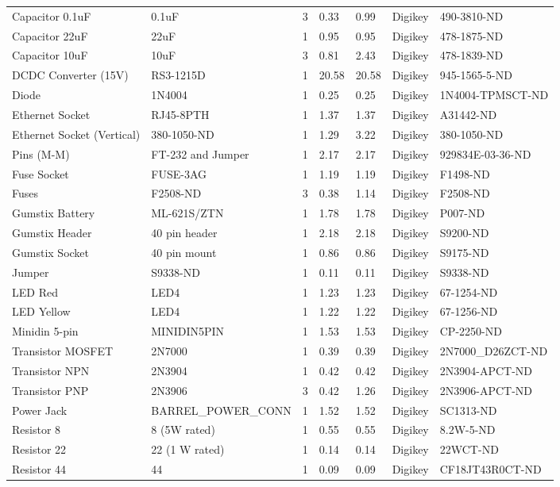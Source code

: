 \begin{landscape}
\begin{center}
\begin{longtable}{|p{2in}|p{1.5in}|p{.75in}|p{.5in}|p{.5in}|p{1in}|p{1.5in}|}
Capacitor 0.1uF & 0.1uF & 3 & 0.33 & 0.99 & Digikey & 490-3810-ND\\ 
Capacitor 22uF & 22uF & 1 & 0.95 & 0.95 & Digikey & 478-1875-ND\\ 
Capacitor 10uF & 10uF & 3 & 0.81 & 2.43 & Digikey & 478-1839-ND\\ 
DCDC Converter (15V) & RS3-1215D & 1 & 20.58 & 20.58 & Digikey & 945-1565-5-ND\\ 
Diode & 1N4004 & 1 & 0.25 & 0.25 & Digikey & 1N4004-TPMSCT-ND\\ 
Ethernet Socket & RJ45-8PTH & 1 & 1.37 & 1.37 & Digikey & A31442-ND\\ 
Ethernet Socket (Vertical) & 380-1050-ND & 1 & 1.29 & 3.22 & Digikey & 380-1050-ND\\ 
Pins (M-M) & FT-232 and Jumper & 1 & 2.17 & 2.17 & Digikey & 929834E-03-36-ND\\ 
Fuse Socket & FUSE-3AG & 1 & 1.19 & 1.19 & Digikey & F1498-ND\\ 
Fuses & F2508-ND & 3 & 0.38 & 1.14 & Digikey & F2508-ND\\ 
Gumstix Battery & ML-621S/ZTN & 1 & 1.78 & 1.78 & Digikey & P007-ND\\ 
Gumstix Header & 40 pin header & 1 & 2.18 & 2.18 & Digikey & S9200-ND\\ 
Gumstix Socket & 40 pin mount & 1 & 0.86 & 0.86 & Digikey & S9175-ND\\ 
Jumper & S9338-ND & 1 & 0.11 & 0.11 & Digikey & S9338-ND\\ 
LED Red & LED4 & 1 & 1.23 & 1.23 & Digikey & 67-1254-ND\\ 
LED Yellow & LED4 & 1 & 1.22 & 1.22 & Digikey & 67-1256-ND\\ 
Minidin 5-pin & MINIDIN5PIN & 1 & 1.53 & 1.53 & Digikey & CP-2250-ND\\ 
Transistor MOSFET & 2N7000 & 1 & 0.39 & 0.39 & Digikey & 2N7000\_D26ZCT-ND\\ 
Transistor NPN & 2N3904 & 1 & 0.42 & 0.42 & Digikey & 2N3904-APCT-ND\\ 
Transistor PNP & 2N3906 & 3 & 0.42 & 1.26 & Digikey & 2N3906-APCT-ND\\ 
Power Jack & BARREL\_POWER\_CONN & 1 & 1.52 & 1.52 & Digikey & SC1313-ND\\ 
Resistor 8 & 8 (5W rated) & 1 & 0.55 & 0.55 & Digikey & 8.2W-5-ND\\ 
Resistor 22 & 22 (1 W rated) & 1 & 0.14 & 0.14 & Digikey & 22WCT-ND\\ 
Resistor 44 & 44 & 1 & 0.09 & 0.09 & Digikey & CF18JT43R0CT-ND\\ 

\end{longtable}
\end{center}
\end{landscape}
